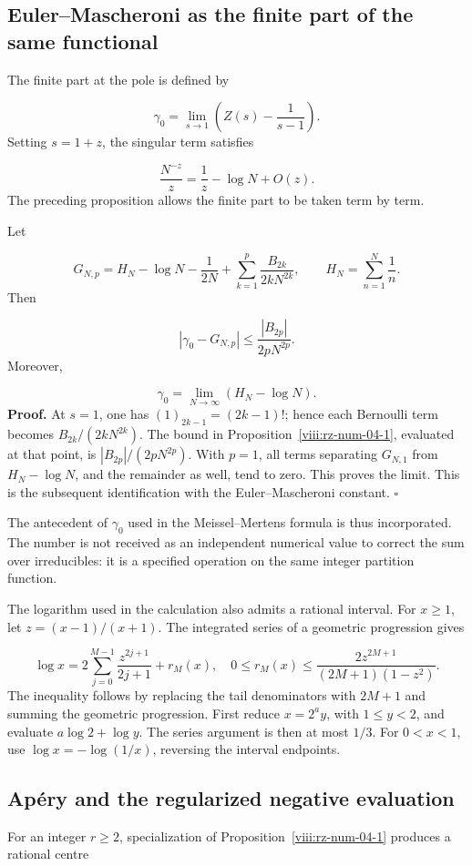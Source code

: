 \subsection{Euler–Mascheroni as the finite part of the same functional}
The finite part at the pole is defined by

\[
\gamma_0=\lim_{s\to1}\left(Z(s)-\frac1{s-1}\right).
\]
Setting \(s=1+z\), the singular term satisfies

\[
\frac{N^{-z}}z=\frac1z-\log N+O(z).
\]
The preceding proposition allows the finite part to be taken term by term.

Let

\[
G_{N,p}=H_N-\log N-\frac1{2N}
+\sum_{k=1}^p\frac{B_{2k}}{2kN^{2k}},
\qquad H_N=\sum_{n=1}^N\frac1n.
\]
Then

\[
|\gamma_0-G_{N,p}|\leq\frac{|B_{2p}|}{2pN^{2p}}.
\]
Moreover,

\[
\gamma_0=\lim_{N\to\infty}(H_N-\log N).
\]
\textbf{Proof.} At \(s=1\), one has \((1)_{2k-1}=(2k-1)!\); hence each Bernoulli term becomes \(B_{2k}/(2kN^{2k})\). The bound in Proposition~\ref{viii:rz-num-04-1}, evaluated at that point, is \(|B_{2p}|/(2pN^{2p})\). With \(p=1\), all terms separating \(G_{N,1}\) from \(H_N-\log N\), and the remainder as well, tend to zero. This proves the limit. This is the subsequent identification with the Euler–Mascheroni constant. \hfill\(\square\)

The antecedent of \(\gamma_0\) used in the Meissel–Mertens formula is thus incorporated. The number is not received as an independent numerical value to correct the sum over irreducibles: it is a specified operation on the same integer partition function.

The logarithm used in the calculation also admits a rational interval. For \(x\geq1\), let \(z=(x-1)/(x+1)\). The integrated series of a geometric progression gives

\[
\log x=2\sum_{j=0}^{M-1}\frac{z^{2j+1}}{2j+1}+r_M(x),
\quad
0\leq r_M(x)\leq
\frac{2z^{2M+1}}{(2M+1)(1-z^2)}.
\]
The inequality follows by replacing the tail denominators with \(2M+1\) and summing the geometric progression. First reduce \(x=2^a y\), with \(1\leq y<2\), and evaluate \(a\log2+\log y\). The series argument is then at most \(1/3\). For \(0<x<1\), use \(\log x=-\log(1/x)\), reversing the interval endpoints.

\subsection{Apéry and the regularized negative evaluation}
For an integer \(r\geq2\), specialization of Proposition~\ref{viii:rz-num-04-1} produces a rational centre

